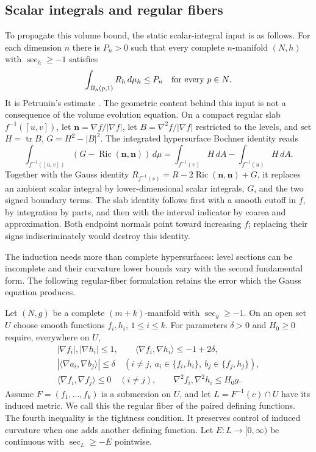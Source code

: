 \subsection{Scalar integrals and regular fibers}
\label{sec:rf-scalar-integral}

To propagate this volume bound, the static scalar-integral input is as follows.
For each dimension $n$ there is $P_n>0$ such that every complete
$n$-manifold $(N,h)$ with $\sec_h\geq-1$ satisfies
\[
             \int_{B_h(p,1)}R_h\,d\mu_h\leq P_n
                         \quad\hbox{for every }p\in N.
\]
It is Petrunin's estimate \cite[Theorem 1.1, manuscript p.~1]{Petrunin2009}.
The geometric content behind this input is not a consequence of the
volume evolution equation.  On a compact regular slab
$f^{-1}([u,v])$, let $\mathbf n=\nabla f/|\nabla f|$, let
$B=\nabla^2 f/|\nabla f|$ restricted to the levels, and set
$H=\operatorname{tr}B$, $G=H^2-|B|^2$.  The integrated hypersurface
Bochner identity reads
\[
 \int_{f^{-1}([u,v])}(G-\operatorname{Ric}(\mathbf n,\mathbf n))\,d\mu
 =\int_{f^{-1}(v)}H\,dA-\int_{f^{-1}(u)}H\,dA.
\]
Together with the Gauss identity
$R_{f^{-1}(s)}=R-2\operatorname{Ric}(\mathbf n,\mathbf n)+G$,
it replaces an ambient scalar integral by lower-dimensional scalar
integrals, $G$, and the two signed boundary terms.  The slab identity
follows first with a smooth cutoff in $f$, by integration by parts,
and then with the interval indicator by coarea and approximation.
Both endpoint normals point toward increasing $f$; replacing their
signs indiscriminately would destroy this identity.

The induction needs more than complete hypersurfaces: level sections
can be incomplete and their curvature lower bounds vary with the
second fundamental form.  The following regular-fiber formulation
retains the error which the Gauss equation produces.

Let $(N,g)$ be a complete $(m+k)$-manifold with $\sec_g\geq-1$.
On an open set $U$ choose smooth functions $f_i,h_i$, $1\leq i\leq k$.
For parameters $\delta>0$ and $H_0\geq0$ require, everywhere on $U$,
\[
\begin{gathered}
 |\nabla f_i|,|\nabla h_i|\leq1,\qquad
 \langle\nabla f_i,\nabla h_i\rangle\leq-1+2\delta,\\
 |\langle\nabla a_i,\nabla b_j\rangle|\leq\delta
 \quad(i\ne j,\ a_i\in\{f_i,h_i\},\ b_j\in\{f_j,h_j\}),\\
 \langle\nabla f_i,\nabla f_j\rangle\leq0\quad(i\ne j),\qquad
 \nabla^2 f_i,\nabla^2 h_i\leq H_0g.
\end{gathered}
\]
Assume $F=(f_1,\ldots,f_k)$ is a submersion on $U$, and let
$L=F^{-1}(c)\cap U$ have its induced metric.  We call this the regular
fiber of the paired defining functions.  The fourth inequality is the
tightness condition.  It preserves control of induced curvature when
one adds another defining function.  Let $E:L\to[0,\infty)$ be
continuous with $\sec_L\geq-E$ pointwise.

